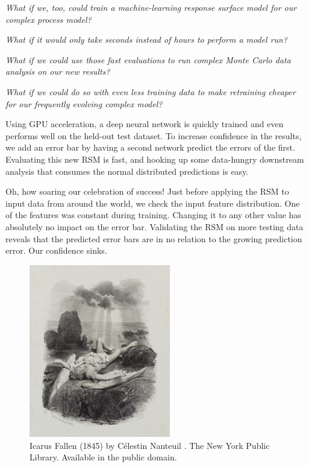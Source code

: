 \begin{paracol}{2}
    {\selectfont
    \begin{center}
        \textit{What if we, too, could train a machine-learning response surface model for our complex process model?}

        \textit{What if it would only take seconds instead of hours to perform a model run?}

        \textit{What if we could use those fast evaluations to run complex Monte Carlo data analysis on our new results?}

        \textit{What if we could do so with even less training data to make retraining cheaper for our frequently evolving complex model?}
    \end{center}

    \noindent Using GPU acceleration, a deep neural network is quickly trained and even performs well on the held-out test dataset. To increase confidence in the results, we add an error bar by having a second network predict the errors of the first. Evaluating this new RSM is fast, and hooking up some data-hungry downstream analysis that consumes the normal distributed predictions is easy.

    \newpar Oh, how soaring our celebration of success! Just before applying the RSM to input data from around the world, we check the input feature distribution. One of the features was constant during training. Changing it to any other value has absolutely no impact on the error bar. Validating the RSM on more testing data reveals that the predicted error bars are in no relation to the growing prediction error. Our confidence sinks.
    }

    \switchcolumn

    \begin{figure}[H]
        \centering
        \includegraphics[width=0.55\textwidth]{icarus/figures/icarus.png}
        \caption[Icarus Fallen by C\'elestin Nanteuil]{Icarus Fallen (1845) by C\'elestin Nanteuil \cite{icarus-1845}. The New York Public Library. Available in the public domain.}
    \end{figure}
\end{paracol}

